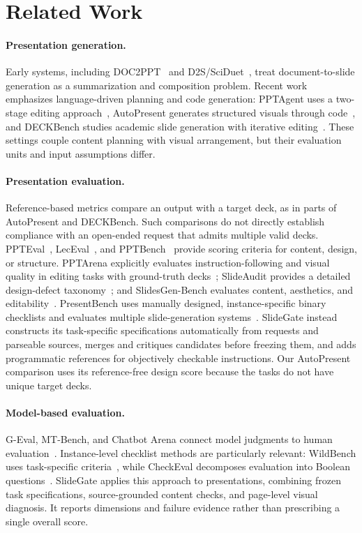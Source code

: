 \section{Related Work}
\paragraph{Presentation generation.}
Early systems, including DOC2PPT~\citep{doc2ppt} and D2S/SciDuet~\citep{d2s}, treat document-to-slide generation as a summarization and composition problem. Recent work emphasizes language-driven planning and code generation: PPTAgent uses a two-stage editing approach~\citep{pptagent}, AutoPresent generates structured visuals through code~\citep{autopresent}, and DECKBench studies academic slide generation with iterative editing~\citep{deckbench}. These settings couple content planning with visual arrangement, but their evaluation units and input assumptions differ.

\paragraph{Presentation evaluation.}
Reference-based metrics compare an output with a target deck, as in parts of AutoPresent and DECKBench. Such comparisons do not directly establish compliance with an open-ended request that admits multiple valid decks. PPTEval~\citep{pptagent}, LecEval~\citep{leceval}, and PPTBench~\citep{pptbench} provide scoring criteria for content, design, or structure. PPTArena explicitly evaluates instruction-following and visual quality in editing tasks with ground-truth decks~\citep{pptarena}; SlideAudit provides a detailed design-defect taxonomy~\citep{slideaudit}; and SlidesGen-Bench evaluates content, aesthetics, and editability~\citep{slidesgen}. PresentBench uses manually designed, instance-specific binary checklists and evaluates multiple slide-generation systems~\citep{presentbench}. SlideGate instead constructs its task-specific specifications automatically from requests and parseable sources, merges and critiques candidates before freezing them, and adds programmatic references for objectively checkable instructions. Our AutoPresent comparison uses its reference-free design score because the tasks do not have unique target decks.

\paragraph{Model-based evaluation.}
G-Eval, MT-Bench, and Chatbot Arena connect model judgments to human evaluation~\citep{geval,mtbench,arena}. Instance-level checklist methods are particularly relevant: WildBench uses task-specific criteria~\citep{wildbench}, while CheckEval decomposes evaluation into Boolean questions~\citep{checkeval}. SlideGate applies this approach to presentations, combining frozen task specifications, source-grounded content checks, and page-level visual diagnosis. It reports dimensions and failure evidence rather than prescribing a single overall score.
